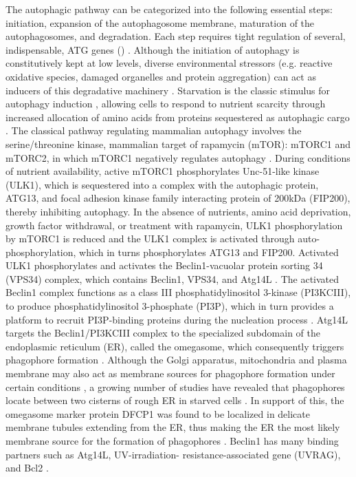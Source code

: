 The autophagic pathway can be categorized into the following essential steps: initiation, expansion of the autophagosome membrane, maturation of the autophagosomes, and degradation. Each step requires tight regulation of several, indispensable, ATG genes () \citep{Feng2014,Maday2014,Parzych2014}. Although the initiation of autophagy is constitutively kept at low levels, diverse environmental stressors (e.g. reactive oxidative species, damaged organelles and protein aggregation) can act as inducers of this degradative machinery \citep{Mizushima2008}. Starvation is the classic stimulus for autophagy induction \citep{Kuma2004,Mizushima2004a}, allowing cells to respond to nutrient scarcity through increased allocation of amino acids from proteins sequestered as autophagic cargo \citep{Hosokawa2009}. The classical pathway regulating mammalian autophagy involves the serine/threonine kinase, mammalian target of rapamycin (mTOR): mTORC1 and mTORC2, in which mTORC1 negatively regulates autophagy \citep{Guertin2009,Noda1998,Ravikumar2010b}. During conditions of nutrient availability, active mTORC1 phosphorylates Unc-51-like kinase (ULK1), which is sequestered into a complex with the autophagic protein, ATG13, and focal adhesion kinase family interacting protein of 200kDa (FIP200), thereby inhibiting autophagy. In the absence of nutrients, amino acid deprivation, growth factor withdrawal, or treatment with rapamycin, ULK1 phosphorylation by mTORC1 is reduced and the ULK1 complex is activated through auto-phosphorylation, which in turns phosphorylates ATG13 and FIP200.  Activated ULK1 phosphorylates and activates the Beclin1-vacuolar protein sorting 34 (VPS34) complex, which contains Beclin1, VPS34, and Atg14L \citep{Itakura2008}. The activated Beclin1 complex functions as a class III phosphatidylinositol 3-kinase (PI3KCIII), to produce phosphatidylinositol 3-phosphate (PI3P), which in turn provides a platform to recruit PI3P-binding proteins during the nucleation process \citep{Hosokawa2009,Kim2011,sarkar2013}. Atg14L targets the Beclin1/PI3KCIII complex to the specialized subdomain of the endoplasmic reticulum (ER), called the omegasome, which consequently triggers phagophore formation \citep{Axe2008,Matsunaga2010}. Although the Golgi apparatus, mitochondria and plasma membrane may also act as membrane sources for phagophore formation under certain conditions \citep{Axe2008,Ravikumar2010}, a growing number of studies have revealed that phagophores locate between two cisterns of rough ER in starved cells \citep{Hayashi-Nishino2009,Yla-Anttila2009}. In support of this, the omegasome marker protein DFCP1 was found to be localized in delicate membrane tubules extending from the ER, thus making the ER the most likely membrane source for the formation of phagophores \citep{Uemura2014}. Beclin1 has many binding partners such as Atg14L, UV-irradiation- resistance-associated gene (UVRAG), and Bcl2 \citep{He2010}.

